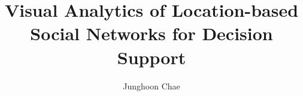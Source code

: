 \documentclass[ece,dissertation]{puthesis}
\title{Visual Analytics of Location-based Social Networks for Decision Support}
\author{Junghoon Chae}{Chae, Junghoon}
\begin{document}
\volume












%

%



\appendices
%
%
%
%
%
%



\end{document}
